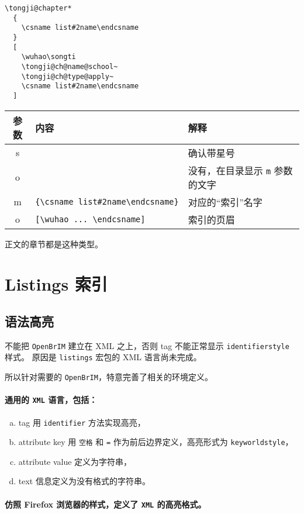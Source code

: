 \documentclass[../Main/thesis.tex]{subfiles}
\begin{document}
\begin{enumerate}
\begin{lstlisting}[language={TongjiLaTeX}, style=colorEX]
\tongji@chapter*
  {
    \csname list#2name\endcsname
  }
  [
    \wuhao\songti
    \tongji@ch@name@school~
    \tongji@ch@type@apply~
    \csname list#2name\endcsname
  ]
\end{lstlisting}

  \begin{longtable}[]{@{}cll@{}}
  \toprule
  参数 & 内容 & 解释\tabularnewline
  \midrule
  \endhead
  s & & 确认带星号\tabularnewline
  o & & 没有，在目录显示 \texttt{m} 参数的文字\tabularnewline
  m &
  \texttt{\{\textbackslash{}csname\ list\#2name\textbackslash{}endcsname\}}
  & 对应的“索引”名字\tabularnewline
  o &
  \texttt{[\textbackslash{}wuhao\ ...\ \textbackslash{}endcsname]} &
  索引的页眉\tabularnewline
  \bottomrule
  \end{longtable}

  正文的章节都是这种类型。
\end{enumerate}

\section{Listings 索引}

\subsection{语法高亮}

不能把 \texttt{OpenBrIM} 建立在 XML 之上，否则 tag 不能正常显示 \texttt{identifierstyle} 样式。
原因是 \texttt{listings} 宏包的 XML 语言尚未完成。

所以针对需要的 \texttt{OpenBrIM}，特意完善了相关的环境定义。

\paragraph{通用的 \texttt{XML} 语言，包括：}
\begin{enumerate}[(a)]
  \item tag 用 \texttt{identifier} 方法实现高亮，
  \item attribute key 用 \texttt{空格} 和 \texttt{=} 作为前后边界定义，高亮形式为 \texttt{keyworldstyle}，
  \item attribute value 定义为字符串，
  \item text 信息定义为没有格式的字符串。
\end{enumerate}

\paragraph{仿照 Firefox 浏览器的样式，定义了 \texttt{XML} 的高亮格式。}
\end{document}
